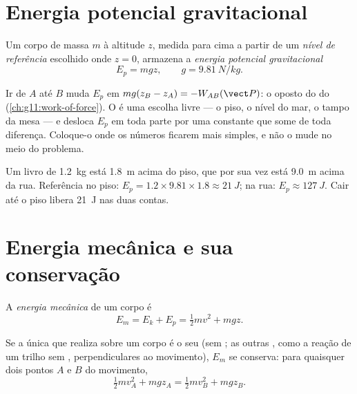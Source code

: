 \section{Energia potencial gravitacional}

\begin{definition}\label{def:g11:mechanical-energy:potential}
Um corpo de massa $m$ à altitude $z$, medida para cima a partir de um
\emph{nível de referência} escolhido onde
$z = 0$, armazena a \emph{energia potencial
gravitacional}
\[
E_p = m g z, \qquad g = \qty{9.81}{N/kg}.
\]
\end{definition}

\begin{remark}\label{rem:g11:mechanical-energy:reference}
Ir de $A$ até $B$ muda $E_p$ em $mg(z_B - z_A) = -W_{AB}(\vect P)$: o
oposto do  do  (\cref{ch:g11:work-of-force}). O  é uma escolha livre --- o piso, o nível do mar, o tampo da
mesa --- e desloca $E_p$ em toda parte por uma constante que some de toda
diferença. Coloque-o onde os números ficarem mais simples, e não o mude
no meio do problema.
\end{remark}

\begin{example}\label{ex:g11:mechanical-energy:shelf}
Um livro de \qty{1.2}{kg} está \qty{1.8}{m} acima do piso, que por sua
vez está \qty{9.0}{m} acima da rua. Referência no piso:
$E_p = 1.2 \times 9.81 \times 1.8 \approx \qty{21}{J}$; na rua:
$E_p \approx \qty{127}{J}$. Cair até o piso libera \qty{21}{J} nas duas
contas.
\end{example}

\section{Energia mecânica e sua conservação}

\begin{definition}\label{def:g11:mechanical-energy:em}
A \emph{energia mecânica} de um corpo é
\[
E_m = E_k + E_p = \tfrac12 m v^2 + m g z .
\]
\end{definition}

\begin{theorem}\label{thm:g11:mechanical-energy:conservation}
Se a única  que realiza  sobre um corpo é o seu  (sem
; as outras , como a reação de um trilho sem ,
perpendiculares ao movimento), $E_m$ se conserva: para quaisquer dois
pontos $A$ e $B$ do movimento,
\[
\tfrac12 m v_A^2 + m g z_A = \tfrac12 m v_B^2 + m g z_B .
\]
\end{theorem}

